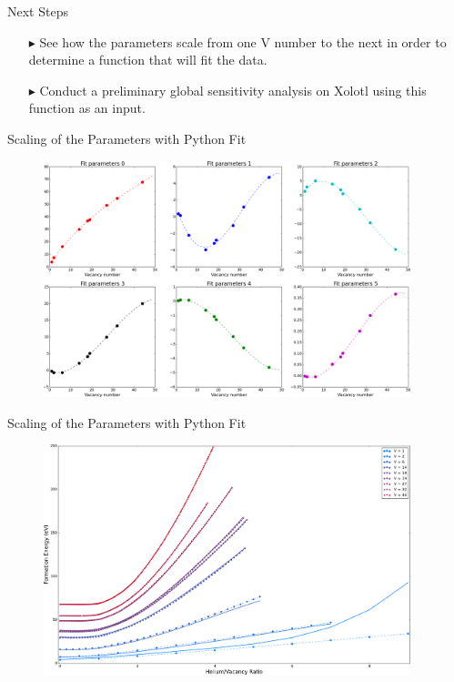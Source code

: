 \documentclass[10pt]{beamer}
\begin{document}
\begin{frame}{Next Steps}
	\Large
    \begin{itemize}
    	\item[$\blacktriangleright$] See how the parameters scale from one V number
    	to the next in order to determine a function that will fit the data.
    	\newline
    	
    	\item[$\blacktriangleright$] Conduct a preliminary global sensitivity
    	analysis on Xolotl using this function as an input.
    \end{itemize}
\end{frame}

\begin{frame}{Scaling of the Parameters with Python Fit}
	\begin{figure}
        \includegraphics[width=0.95\textwidth]{parametersIN}
    \end{figure}
\end{frame}

\begin{frame}{Scaling of the Parameters with Python Fit}
	\begin{figure}
        \includegraphics[width=0.95\textwidth]{energyIN}
    \end{figure}
\end{frame}
\end{document}
